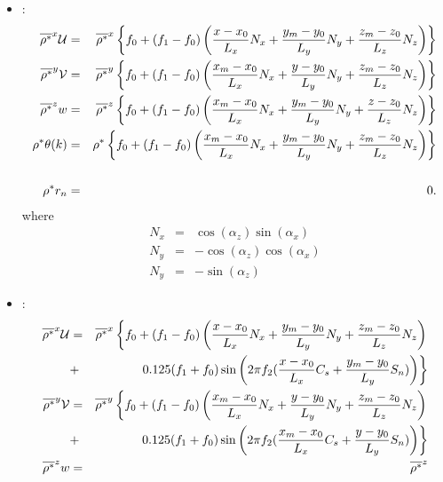 \begin{itemize}
\item {} :
\begin{eqnarray}
\overline{\rho^{*}}^{x} {\cal U} & = & \overline{\rho^{*}}^{x}
\left\{ f_{0} + (f_{1}- f_{0}) \left( \dfrac{x-x_{0}}{L_{x}} N_{x}
+ \dfrac{y_{m}-y_{0}}{L_{y}} N_{y} + \dfrac{z_{m}-z_{0}}{L_{z}} N_{z} \right)\right\}\\
\overline{\rho^{*}}^{y}{\cal V} & = &    \overline{\rho^{*}}^{y}
\left\{ f_{0} + (f_{1}- f_{0}) \left( \dfrac{x_{m}-x_{0}}{L_{x}} N_{x}
+ \dfrac{y-y_{0}}{L_{y}} N_{y} + \dfrac{z_{m}-z_{0}}{L_{z}} N_{z}\right)\right\} \\
\overline{ \rho^{*}}^{z} w & = &  \overline{\rho^{*}}^{z}
\left\{ f_{0} + (f_{1}- f_{0}) \left( \dfrac{x_{m}-x_{0}}{L_{x}} N_{x}
+ \dfrac{y_{m}-y_{0}}{L_{y}} N_{y} + \dfrac{z-z_{0}}{L_{z}} N_{z}\right)\right\} \\
\rho^{*} \theta(k) & = &   \rho^{*}
\left\{ f_{0} + (f_{1}- f_{0}) \left( \dfrac{x_{m}-x_{0}}{L_{x}} N_{x}
+ \dfrac{y_{m}-y_{0}}{L_{y}} N_{y} + \dfrac{z_{m}-z_{0}}{L_{z}} N_{z} \right)\right\}\\
\\
\rho^{*} r_{n} & = & 0.
\end{eqnarray}
where
\begin{eqnarray}
N_{x} & = & \cos(\alpha_{z})\sin(\alpha_{x}) \\
N_{y} & = & - \cos(\alpha_{z})\cos(\alpha_{x}) \\
N_{y} & = & - \sin(\alpha_{z})
\end{eqnarray}
\item {}:
\begin{eqnarray}
\overline{\rho^{*}}^{x} {\cal U} & = & \overline{\rho^{*}}^{x}
\left\{ f_{0} + (f_{1}- f_{0}) \left( \dfrac{x-x_{0}}{L_{x}} N_{x}
+ \dfrac{y_{m}-y_{0}}{L_{y}} N_{y} + \dfrac{z_{m}-z_{0}}{L_{z}} N_{z}
\right) \right. \\
& + & \left. 0.125 (f_{1}+ f_{0}) \sin \left(2 \pi f_{2} (\dfrac{x-x_{0}}{L_{x}} C_{s}
+ \dfrac{y_{m}-y_{0}}{L_{y}} S_{n}) \right) \right\}
 \\
\overline{\rho^{*}}^{y}{\cal V} & = &    \overline{\rho^{*}}^{y}
\left\{ f_{0} + (f_{1}- f_{0}) \left( \dfrac{x_{m}-x_{0}}{L_{x}} N_{x}
+ \dfrac{y-y_{0}}{L_{y}} N_{y} + \dfrac{z_{m}-z_{0}}{L_{z}} N_{z} \right)\right.
\\ & + & \left.0.125 (f_{1}+ f_{0}) \sin \left( 2 \pi f_{2}( \dfrac{x_{m}-x_{0}}{L_{x}} C_{s}
+ \dfrac{y-y_{0}}{L_{y}} S_{n} ) \right) \right\}\\
\overline{ \rho^{*}}^{z} w & = &  \overline{\rho^{*}}^{z}

\end{eqnarray}
\end{itemize}
